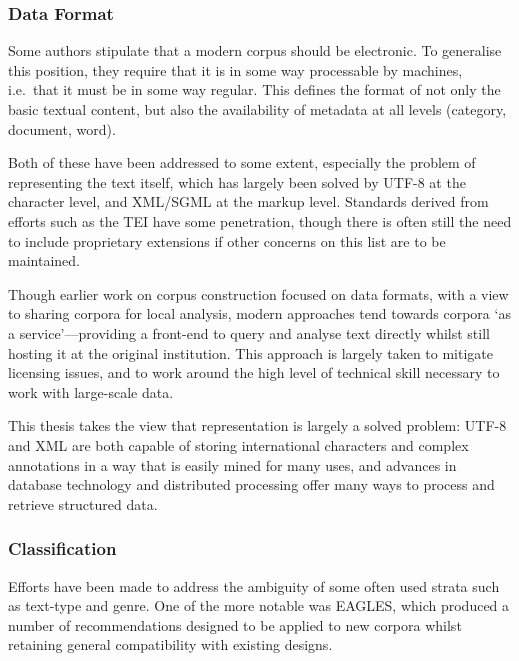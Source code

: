 

\subsubsection{Data Format}
Some authors stipulate that a modern corpus should be electronic.  To generalise this position, they require that it is in some way processable by machines, i.e.\ that it must be in some way regular.
This defines the format of not only the basic textual content, but also the availability of metadata at all levels (category, document, word).

Both of these have been addressed to some extent, especially the problem of representing the text itself, which has largely been solved by UTF-8 at the character level, and XML/SGML at the markup level.  Standards derived from efforts such as the TEI\cite{ide1995tei} have some penetration, though there is often still the need to include proprietary extensions if other concerns on this list are to be maintained.

Though earlier work on corpus construction focused on data formats\cite{atkins1992corpus,EagTcwgCtypeaglespreliminary}, with a view to sharing corpora for local analysis, modern approaches tend towards corpora `as a service'\cite{hardie2012cqpweb,ferraresi2008introducing}---providing a front-end to query and analyse text directly whilst still hosting it at the original institution.  This approach is largely taken to mitigate licensing issues, and to work around the high level of technical skill necessary to work with large-scale data.

This thesis takes the view that representation is largely a solved problem: UTF-8 and XML are both capable of storing international characters and complex annotations in a way that is easily mined for many uses, and advances in database technology and distributed processing offer many ways to process and retrieve structured data.




\subsubsection{Classification}
Efforts have been made to address the ambiguity of some often used strata such as text-type and genre.  One of the more notable was EAGLES\cite{EagTcwgCtypeaglespreliminary}, which produced a number of recommendations designed to be applied to new corpora whilst retaining general compatibility with existing designs.


